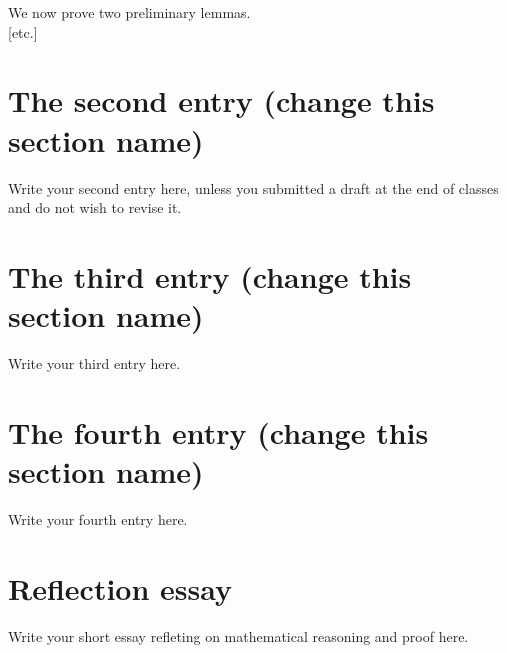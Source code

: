 \documentclass[12pt]{article}
\theoremstyle{definition}
\begin{document}
We now prove two preliminary lemmas.\\

[etc.]


\newpage
\section{The second entry (change this section name)}

Write your second entry here, unless you submitted a draft at the end of classes and do not wish to revise it.

\newpage
\section{The third entry (change this section name)}

Write your third entry here.

\newpage
\section{The fourth entry (change this section name)}

Write your fourth entry here.


\newpage
\section{Reflection essay}

Write your short essay refleting on mathematical reasoning and proof here.
\end{document}
